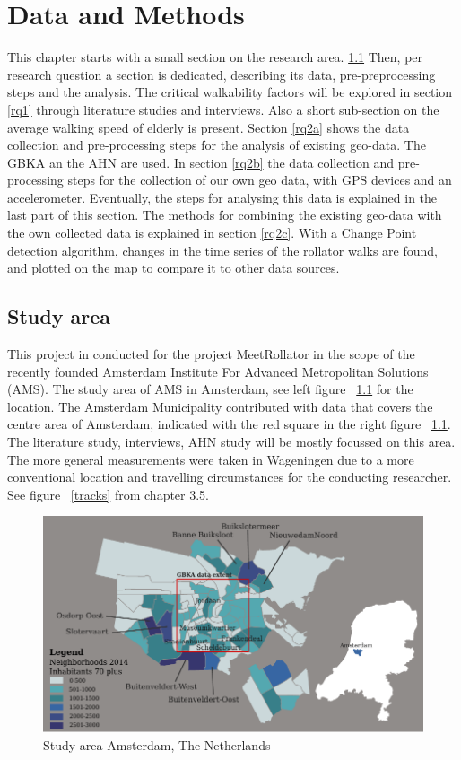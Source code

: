 \chapter[Data and Methods]{Data and Methods}

This chapter starts with a small section on the research area. \ref{area}
Then, per research question a section is dedicated, describing its data, pre-preprocessing steps and the analysis. The critical walkability factors will be explored in section \ref{rq1} through literature studies and interviews. Also a short sub-section on the average walking speed of elderly is present. 
Section \ref{rq2a} shows the data collection and pre-processing steps for the analysis of existing geo-data. The GBKA an the AHN are used.
In section \ref{rq2b} the data collection and pre-processing steps for the collection of our own geo data, with GPS devices and an accelerometer. Eventually, the steps for analysing this data is explained in the last part of this section.
The methods for combining the existing geo-data with the own collected data is explained in section \ref{rq2c}. With a Change Point detection algorithm, changes in the time series of the rollator walks are found, and plotted on the map to compare it to other data sources. 
\clearpage
\section{Study area}\label{area}
This project in conducted for the project MeetRollator in the scope of the recently founded Amsterdam Institute For Advanced Metropolitan Solutions (AMS). The study area of AMS in Amsterdam, see left figure ~\ref{kaart} for the location. The Amsterdam Municipality contributed with data that covers the centre area of Amsterdam, indicated with the red square in the right figure ~\ref{kaart}. 
The literature study, interviews, AHN study will be mostly focussed on this area. The more general measurements were taken in Wageningen due to a more conventional location and travelling circumstances for the conducting researcher. See figure ~\ref{tracks} from chapter 3.5. 

\begin{figure}[h]
\includegraphics[width=\textwidth]{img/M1_StudyArea.pdf}
\centering
\caption{Study area Amsterdam, The Netherlands\label{kaart}}
\end{figure}

